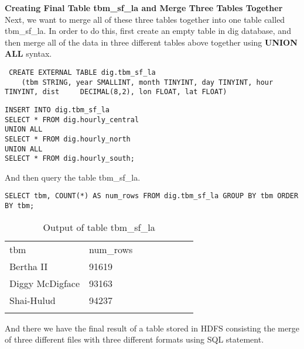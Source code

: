 \documentclass[a4paper,
							12pt,
							oneside,
							openright,
							DIV10,
							numbers=noendperiod
							]{scrreprt} %
\begin{document}
\noindent
\textbf{Creating Final Table tbm\_sf\_la and Merge Three Tables Together}\\

\noindent
Next, we want to merge all of these three tables together into one table called tbm\_sf\_la. In order to do this, first create an empty table in dig database, and then merge all of the data in three different tables above together using \textbf{UNION ALL} syntax.\\

\begin{lstlisting}
 CREATE EXTERNAL TABLE dig.tbm_sf_la 
 	(tbm STRING, year SMALLINT, month TINYINT, day TINYINT, hour  TINYINT, dist 	DECIMAL(8,2), lon FLOAT, lat FLOAT)
\end{lstlisting}

\begin{lstlisting}
INSERT INTO dig.tbm_sf_la
SELECT * FROM dig.hourly_central
UNION ALL
SELECT * FROM dig.hourly_north
UNION ALL
SELECT * FROM dig.hourly_south;
\end{lstlisting}	

\noindent
And then query the table tbm\_sf\_la.

\begin{lstlisting}
SELECT tbm, COUNT(*) AS num_rows FROM dig.tbm_sf_la GROUP BY tbm ORDER BY tbm;
\end{lstlisting}

\begin{table}[ht]
\centering
\caption{Output of table tbm\_sf\_la}
\label{tab:my-table}
\begin{tabular}{llllllll}
{\color[HTML]{000000} tbm} & {\color[HTML]{000000} num\_rows} & {\color[HTML]{000000} } & {\color[HTML]{000000} } & {\color[HTML]{000000} } & {\color[HTML]{000000} } & {\color[HTML]{000000} } & {\color[HTML]{000000} } \\
{\color[HTML]{000000} Bertha II} & {\color[HTML]{000000} 91619} & {\color[HTML]{000000} } & {\color[HTML]{000000} } & {\color[HTML]{000000} } & {\color[HTML]{000000} } & {\color[HTML]{000000} } & {\color[HTML]{000000} } \\
{\color[HTML]{000000} Diggy McDigface} & {\color[HTML]{000000} 93163} & {\color[HTML]{000000} } & {\color[HTML]{000000} } & {\color[HTML]{000000} } & {\color[HTML]{000000} } & {\color[HTML]{000000} } & {\color[HTML]{000000} } \\
{\color[HTML]{000000} Shai-Hulud} & {\color[HTML]{000000} 94237} & {\color[HTML]{000000} } & {\color[HTML]{000000} } & {\color[HTML]{000000} } & {\color[HTML]{000000} } & {\color[HTML]{000000} } & {\color[HTML]{000000} } \\
{\color[HTML]{000000} } & {\color[HTML]{000000} } & {\color[HTML]{000000} } & {\color[HTML]{000000} } & {\color[HTML]{000000} } & {\color[HTML]{000000} } & {\color[HTML]{000000} } & {\color[HTML]{000000} } 
\end{tabular}
\end{table}

\noindent
And there we have the final result of a table stored in HDFS consisting the merge of three different files with three different formats using SQL statement.\\
\end{document}
